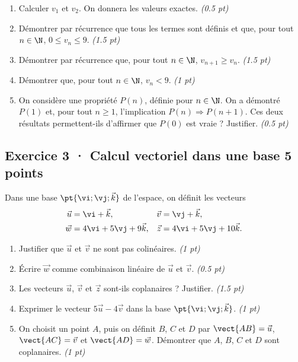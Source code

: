 \begin{enumerate}

\item Calculer $v_1$ et $v_2$. On donnera les valeurs exactes. \hfill\textit{(\num{0,5} pt)}

\item Démontrer par récurrence que tous les termes sont définis et que, pour tout $n\in\N$, $0\le v_n\le9$. \hfill\textit{(\num{1,5} pt)}

\item Démontrer par récurrence que, pour tout $n\in\N$, $v_{n+1}\ge v_n$. \hfill\textit{(\num{1,5} pt)}

\item Démontrer que, pour tout $n\in\N$, $v_n<9$. \hfill\textit{(1 pt)}

\item On considère une propriété $P(n)$, définie pour $n\in\N$. On a démontré $P(1)$ et, pour tout $n\ge1$, l'implication $P(n)\Rightarrow P(n+1)$. Ces deux résultats permettent-ils d'affirmer que $P(0)$ est vraie ? Justifier. \hfill\textit{(\num{0,5} pt)}

\end{enumerate}

\mxnewpage{}

\subsection*{Exercice 3 · Calcul vectoriel dans une base \hfill 5 points}Dans une base $\pt{\vi;\vj;\vec k}$ de l'espace, on définit les vecteurs
\[\begin{aligned}\vec u&=\vi+\vec k,&\vec v&=\vj+\vec k,\\
\vec w&=4\vi+5\vj+9\vec k,&\vec z&=4\vi+5\vj+10\vec k.\end{aligned}\]

\begin{enumerate}

\item Justifier que $\vec u$ et $\vec v$ ne sont pas colinéaires. \hfill\textit{(1 pt)}

\item Écrire $\vec w$ comme combinaison linéaire de $\vec u$ et $\vec v$. \hfill\textit{(\num{0,5} pt)}

\item Les vecteurs $\vec u$, $\vec v$ et $\vec z$ sont-ils coplanaires ? Justifier. \hfill\textit{(\num{1,5} pt)}

\item Exprimer le vecteur $5\vec u-4\vec v$ dans la base $\pt{\vi;\vj;\vec k}$. \hfill\textit{(1 pt)}

\item On choisit un point $A$, puis on définit $B$, $C$ et $D$ par $\vect{AB}=\vec u$, $\vect{AC}=\vec v$ et $\vect{AD}=\vec w$. Démontrer que $A$, $B$, $C$ et $D$ sont coplanaires. \hfill\textit{(1 pt)}

\end{enumerate}

